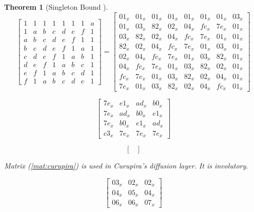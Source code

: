 \documentclass{report}
\newtheorem{theorem}{Theorem}{\bfseries}{\itshape}
\begin{document}
\begin{theorem}[Singleton Bound \cite{SloaneBook}]
\begin{equation}\label{mat:fox-mu8}
\begin{bmatrix}
1 & 1 & 1 & 1 & 1 & 1 & 1 & a\\
1 & a & b & c & d & e & f & 1\\
a & b & c & d & e & f & 1 & 1\\
b & c & d & e & f & 1 & a & 1\\
c & d & e & f & 1 & a & b & 1\\
d & e & f & 1 & a & b & c & 1\\
e & f & 1 & a & b & c & d & 1\\
f & 1 & a & b & c & d & e & 1
\end{bmatrix}
=
\begin{bmatrix}
01_x & 01_x & 01_x & 01_x & 01_x & 01_x & 01_x & 03_x\\
01_x & 03_x & 82_x & 02_x & 04_x & fc_x & 7e_x & 01_x\\
03_x & 82_x & 02_x & 04_x & fc_x & 7e_x & 01_x & 01_x\\
82_x & 02_x & 04_x & fc_x & 7e_x & 01_x & 03_x & 01_x\\
02_x & 04_x & fc_x & 7e_x & 01_x & 03_x & 82_x & 01_x\\
04_x & fc_x & 7e_x & 01_x & 03_x & 82_x & 02_x & 01_x\\
fc_x & 7e_x & 01_x & 03_x & 82_x & 02_x & 04_x & 01_x\\
7e_x & 01_x & 03_x & 82_x & 02_x & 04_x & fc_x & 01_x
\end{bmatrix}
\end{equation}

\begin{equation}\label{mat:fox-mu4-inv}
\begin{bmatrix}
7e_x & e1_x & ad_x & b0_x\\
7e_x & ad_x & b0_x & e1_x\\
7e_x & b0_x & e1_x & ad_x\\
c3_x & 7e_x & 7e_x & 7e_x
\end{bmatrix}
\end{equation}

\begin{equation}\label{mat:fox-mu8-inv}
\begin{bmatrix}
\end{bmatrix}
\end{equation}

Matrix (\ref{mat:curupira}) is used in Curupira's diffusion layer. It is involutory.

\begin{equation}\label{mat:curupira}
\begin{bmatrix}
03_x & 02_x & 02_x\\
04_x & 05_x & 04_x\\
06_x & 06_x & 07_x
\end{bmatrix}
\end{equation}


\end{theorem}
\end{document}
